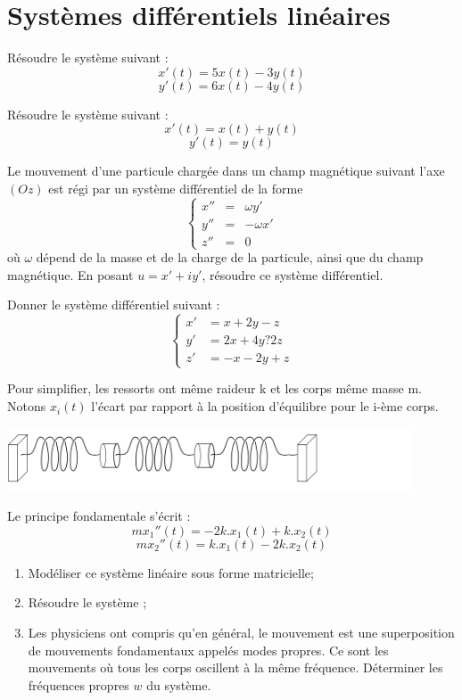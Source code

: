 \documentclass{book}
\begin{document}
\section*{Systèmes différentiels linéaires }
\begin{Exercice}[Diagonalisable]
Résoudre le système suivant :
$$ x'(t) = 5 x(t) -3y(t)$$
$$ y'(t) = 6 x(t) -4y(t)$$
\end{Exercice}
\begin{Exercice}
Résoudre le système suivant :
$$ x'(t) = x(t)  + y(t)$$
$$ y'(t) =   y(t)$$
\end{Exercice}
\begin{Exercice}
Le mouvement d'une particule chargée dans un champ magnétique suivant l'axe $(Oz)$
est régi par un système différentiel de la forme
$$\left\{
\begin{array}{rcl}
x''&=&\omega y'\\
y''&=&-\omega x'\\
z''&=&0
\end{array}\right.$$
où $\omega$ dépend de la masse et de la charge de la particule, ainsi que du champ magnétique. 
En posant $u=x'+iy'$, résoudre ce système différentiel.
\end{Exercice}
\begin{Exercice}[Diagonalisable]
Donner le système différentiel suivant :
$$\begin{cases}
x' &= x+2y-z \\
y' &= 2x+4y?2z\\
z' &= -x-2y+z
\end{cases}$$
\end{Exercice}
\begin{Exercice}
Pour simplifier, les ressorts ont même raideur k et les corps même masse m.
Notons $x_i(t)$ l'écart par rapport à la position d'équilibre pour le i-ème corps.\\
\begin{center}
\includegraphics[width=12cm]{resort.png}\\
\end{center}
Le principe fondamentale s'écrit :
$$m x_1''(t) = -2k.x_1(t)  +k.x_2(t)$$
$$m x_2''(t) = k.x_1(t)  - 2k.x_2(t)$$
\begin{enumerate}
\item Modéliser ce système linéaire sous forme matricielle;
\item Résoudre le système ;
\item Les physiciens ont compris qu'en général, le mouvement est une superposition de mouvements
fondamentaux appelés modes propres. Ce sont les mouvements où tous les corps oscillent à la
même fréquence. Déterminer les fréquences propres $w$ du système. 
\end{enumerate}
\end{Exercice}
%
\end{document}
